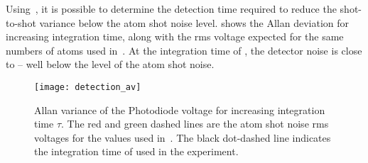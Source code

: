 Using~, it is possible to determine the
detection time required to reduce the shot-to-shot variance below the
atom shot noise level.  shows the Allan deviation for increasing
integration time, along with the rms voltage expected
for the same numbers of atoms used
in~. At the integration time of
, the detector noise
is close to  -- well below the level of the
atom shot noise.
\begin{figure}[htpb!]
  \centering
  \texttt{[image: detection\_av]}
  \caption[Allan variance of the Photodiode voltage.]{Allan variance of the Photodiode voltage for increasing
  integration time \(\tau\). The red and green dashed lines are the
atom shot noise rms voltages for the values used
in~. The black dot-dashed line indicates the
integration time of  used in the
experiment.}
  \label{fig:detecion_av}
\end{figure}




